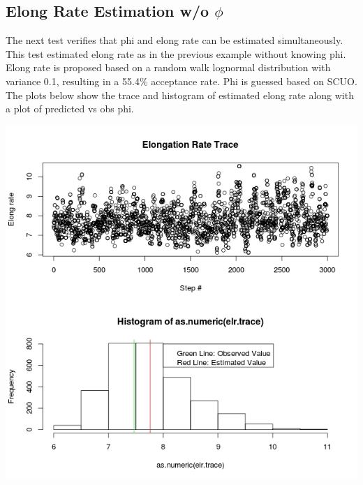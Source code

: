 \documentclass{article}
\begin{document}
	\subsection{Elong Rate Estimation w/o $\phi$} 	 	
 	
 	The next test verifies that phi and elong rate can be estimated simultaneously. This test estimated elong rate as in the previous example without knowing phi. Elong rate is proposed based on a random walk lognormal distribution with variance 0.1, resulting in a 55.4\% acceptance rate. Phi is guessed based on SCUO. The plots below show the trace and histogram of estimated elong rate along with a plot of predicted vs obs phi.
 	
 	\includegraphics[scale=0.4]{../chosen_100/genome_parms/elr_test_wo_phi/Rplot.jpeg}
 	
\end{document}
